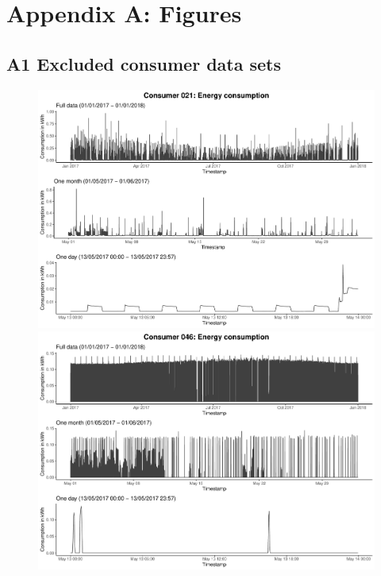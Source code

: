 
\section*{Appendix A: Figures}\label{App:Figures}

\subsection*{A1 Excluded consumer data sets}\label{App:Figures:Excludedc}

\begin{centering}
\begin{figure}[!htbp]
        \includegraphics[width=\textwidth-0.85cm]{thesis/graphs/timeseries/c021_cons.pdf}\vspace{0.3cm}
        \includegraphics[width=\textwidth-0.85cm]{thesis/graphs/timeseries/c046_cons.pdf}

\end{figure}
\end{centering}
